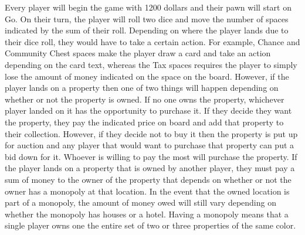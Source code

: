 \documentclass{article}
\begin{document}
Every player will begin the game with 1200 dollars and their pawn will start on Go. On their turn, the player will roll two dice and move the number of spaces indicated by the sum of their roll.  Depending on where the player lands due to their dice roll, they would have to take a certain action.  For example, Chance and Community Chest spaces make the player draw a card and take an action depending on the card text, whereas the Tax spaces requires the player to simply lose the amount of money indicated on the space on the board. However, if the player lands on a property then one of two things will happen depending on whether or not the property is owned.  If no one owns the property, whichever player landed on it has the opportunity to purchase it.  If they decide they want the property, they pay the indicated price on board and add that property to their collection. However, if they decide not to buy it then the property is put up for auction and any player that would want to purchase that property can put a bid down for it.  Whoever is willing to pay the most will purchase the property.  If the player lands on a property that is owned by another player, they must pay a sum of money to the owner of the property that depends on whether or not the owner has a monopoly at that location.  In the event that the owned location is part of a monopoly, the amount of money owed will still vary depending on whether the monopoly has houses or a hotel.  Having a monopoly means that a single player owns one the entire set of two or three properties of the same color.\cite{rules}
\end{document}
